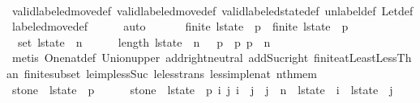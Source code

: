 \begin{isabellebody}
\ \ \ \ \isamarkupfalse%
\ valid{\isacharunderscore}labeled{\isacharunderscore}move{\isacharunderscore}def\ valid{\isacharunderscore}labeled{\isacharunderscore}move{\isacharprime}{\isacharunderscore}def\ valid{\isacharunderscore}labeled{\isacharunderscore}state{\isacharunderscore}def\ unlabel{\isacharunderscore}def\ Let{\isacharunderscore}def\ labeled{\isacharunderscore}move{\isacharunderscore}def\isanewline
\ \ \ \ \isamarkupfalse%
\ auto\isanewline
\ \ \isanewline
\ \ \isamarkupfalse%
\ {\isachardoublequoteopen}finite\ {\isacharparenleft}l{\isacharunderscore}state\ {\isacharbang}\ p{}{\isacharparenright}\ {\isasymand}\ finite\ {\isacharparenleft}l{\isacharunderscore}state\ {\isacharbang}\ p{}{\isacharparenright}{\isachardoublequoteclose}\isanewline
\ \ \ \ \isamarkupfalse%
\ {\isacharbackquoteopen}{\isasymUnion}\ {\isacharparenleft}set\ l{\isacharunderscore}state{\isacharparenright}\ {\isacharequal}\ {\isacharbraceleft}{}{\isachardot}{\isachardot}{\isacharless}n{\isacharbraceright}{\isacharbackquoteclose}\isanewline
\ \ \ \ \isamarkupfalse%
\ {\isacharbackquoteopen}length\ l{\isacharunderscore}state\ {\isacharequal}\ n\ {\isacharplus}\ {}{\isacharbackquoteclose}\ {\isacharbackquoteopen}p{}\ {\isacharless}\ p{}{\isacharbackquoteclose}\ {\isacharbackquoteopen}p{}\ {\isasymle}\ n{\isacharbackquoteclose}\isanewline
\ \ \ \ \isamarkupfalse%
\ {\isacharparenleft}metis\ One{\isacharunderscore}nat{\isacharunderscore}def\ Union{\isacharunderscore}upper\ add{\isachardot}right{\isacharunderscore}neutral\ add{\isacharunderscore}Suc{\isacharunderscore}right\ finite{\isacharunderscore}atLeastLessThan\ finite{\isacharunderscore}subset\ le{\isacharunderscore}imp{\isacharunderscore}less{\isacharunderscore}Suc\ le{\isacharunderscore}less{\isacharunderscore}trans\ less{\isacharunderscore}imp{\isacharunderscore}le{\isacharunderscore}nat\ nth{\isacharunderscore}mem{\isacharparenright}\isanewline
\isanewline
\ \ \isamarkupfalse%
\ {\isachardoublequoteopen}stone\ {\isasymnotin}\ l{\isacharunderscore}state\ {\isacharbang}\ p{}{\isachardoublequoteclose}\isanewline
\ \ \ \ \isamarkupfalse%
\ {\isacharbackquoteopen}stone\ {\isasymin}\ l{\isacharunderscore}state\ {\isacharbang}\ p{}{\isacharbackquoteclose}\ {\isacharbackquoteopen}{\isasymforall}i\ j{\isachardot}\ i\ {\isacharless}\ j\ {\isasymand}\ j\ {\isasymle}\ n\ {\isasymlongrightarrow}\ l{\isacharunderscore}state\ {\isacharbang}\ i\ {\isasyminter}\ l{\isacharunderscore}state\ {\isacharbang}\ j\ {\isacharequal}\ {\isacharbraceleft}{\isacharbraceright}{\isacharbackquoteclose}\isanewline

\end{isabellebody}
